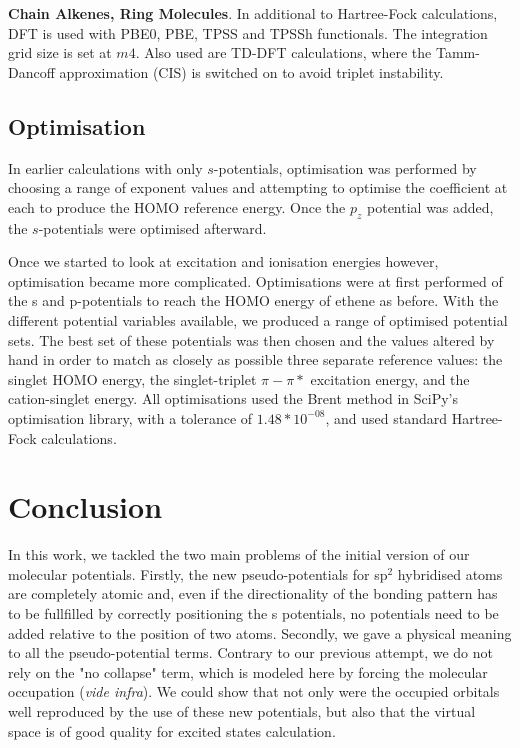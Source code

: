 \documentclass[journal=jctcce,manuscript=article]{achemso}
\begin{document}
\textbf{Chain Alkenes, Ring Molecules}. In additional to Hartree-Fock calculations, DFT is used with PBE0, PBE, TPSS and TPSSh functionals. \cite{pbe0,pbe,tpss,tpssh} The integration grid size is set at \(m4\). Also used are TD-DFT calculations, where the Tamm-Dancoff approximation (CIS) \cite{tammdancoff} is switched on to avoid triplet instability.

\subsection{Optimisation}

In earlier calculations with only \(s\)-potentials, optimisation was performed by choosing a range of exponent values and attempting to optimise the coefficient at each to produce the HOMO reference energy. Once the \(p_{z}\) potential was added, the \(s\)-potentials were optimised afterward. 

Once we started to look at excitation and ionisation energies however, optimisation became more complicated. Optimisations were at first performed of the s and p-potentials to reach the HOMO energy of ethene as before. With the different potential variables available, we produced a range of optimised potential sets. The best set of these potentials was then chosen and the values altered by hand in order to match as closely as possible three separate reference values: the singlet HOMO energy, the singlet-triplet \(\pi-\pi*\) excitation energy, and the cation-singlet energy. All optimisations used the Brent method in SciPy's optimisation library, with a tolerance of \(1.48*10^{-08}\), and used standard Hartree-Fock calculations.\cite{scipy}

\section{Conclusion}
In this work, we tackled the two main problems of the initial version of our
molecular potentials.
Firstly, the new pseudo-potentials for sp$^2$ hybridised
atoms are completely atomic and, even if the directionality of the bonding pattern
has to be fullfilled by correctly positioning the s potentials, no potentials need to
be added relative to the position of two atoms.
Secondly, we gave a physical meaning to all the pseudo-potential
terms.
Contrary to our previous attempt, we do not rely on the "no collapse" term,
which is modeled here by forcing the molecular occupation (\emph{vide infra}).
We could show that not only were the occupied orbitals well reproduced
by the use of these new potentials, but also that the virtual space is of good quality
for excited states calculation.
\end{document}
